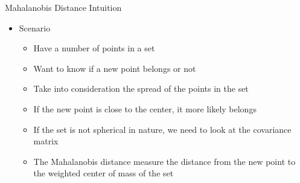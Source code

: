 \documentclass[aspectratio=169]{beamer}
\begin{document}
\begin{frame}{Mahalanobis Distance Intuition}

\begin{itemize}
\item Scenario
\begin{itemize}
\item Have a number of points in a set
\item Want to know if a new point belongs or not
\item Take into consideration the spread of the points in the set
\item If the new point is close to the center, it more likely belongs
\item If the set is not spherical in nature, we need to look at the covariance matrix
\item The Mahalanobis distance measure the distance from the new point to the weighted center of mass of the set
\end{itemize}
\end{itemize}
\end{frame}
\end{document}
